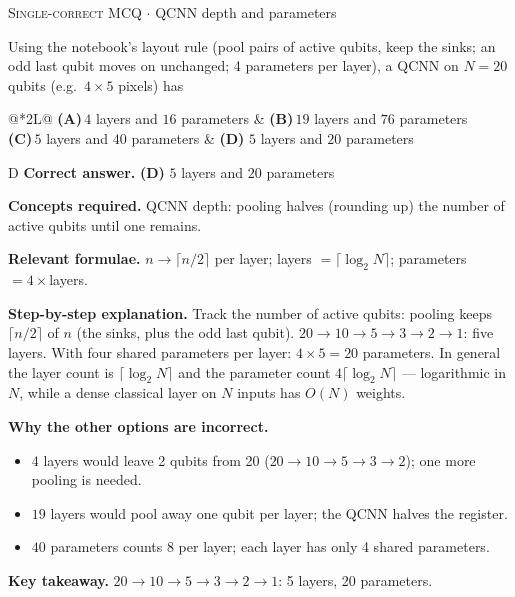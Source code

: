 \documentclass[11pt,a4paper]{article}
\newcommand{\optlabel}[1]{\textbf{(#1)}}
\newcommand{\correctlabel}[1]{\textcolor{okgreen}{\textbf{(#1)}\,\ding{51}}}
\newenvironment{qitem}[1]{\begin{list}{}{\setlength{\leftmargin}{3.3em}\setlength{\labelwidth}{3.1em}%
  \setlength{\labelsep}{0.2em}\setlength{\topsep}{3pt}\setlength{\parsep}{3pt}}\item[\textbf{Q.#1}\hfill]}{\end{list}}
\newcommand{\qsep}{\par\vspace{2pt}{\color{black!15}\hrule}\vspace{4pt}}
\newcommand{\qmeta}[2]{{\footnotesize\color{black!60}\textsc{#1} \;$\cdot$\; #2}\par}
\begin{document}
\begin{qitem}{49}
\qmeta{Single-correct MCQ}{QCNN depth and parameters}
Using the notebook's layout rule (pool pairs of active qubits, keep the sinks; an odd last qubit moves on unchanged;
4 parameters per layer), a QCNN on $N = 20$ qubits (e.g.\ $4\times5$ pixels) has
\par\smallskip\noindent\begin{tabularx}{\linewidth}{@{}*{2}{L}@{}}
\optlabel{A}\,$4$ layers and $16$ parameters & \optlabel{B}\,$19$ layers and $76$ parameters \\[3pt]
\optlabel{C}\,$5$ layers and $40$ parameters & \correctlabel{D}\,$5$ layers and $20$ parameters
\end{tabularx}
\end{qitem}
\begin{solbox}{D}
\textbf{\color{brand}Correct answer.} \textcolor{okgreen}{\textbf{(D)}} $5$ layers and $20$ parameters

\textbf{\color{brand}Concepts required.} QCNN depth: pooling halves (rounding up) the number of active qubits until one remains.

\textbf{\color{brand}Relevant formulae.} $n \to \lceil n/2\rceil$ per layer; layers $= \lceil\log_2N\rceil$; parameters $= 4\times$layers.

\textbf{\color{brand}Step-by-step explanation.} Track the number of active qubits: pooling keeps $\lceil n/2\rceil$ of $n$ (the sinks, plus the odd last qubit).
$20 \to 10 \to 5 \to 3 \to 2 \to 1$: five layers. With four shared parameters per layer: $4\times5 = 20$ parameters.
In general the layer count is $\lceil\log_2 N\rceil$ and the parameter count $4\lceil\log_2 N\rceil$ --- logarithmic in $N$, while a
dense classical layer on $N$ inputs has $O(N)$ weights.

\textbf{\color{brand}Why the other options are incorrect.}
\begin{itemize}[leftmargin=2.4em, itemsep=1pt, topsep=2pt]
\item[\textbf{(A)}] $4$ layers would leave 2 qubits from 20 ($20\to10\to5\to3\to2$); one more pooling is needed.
\item[\textbf{(B)}] $19$ layers would pool away one qubit per layer; the QCNN halves the register.
\item[\textbf{(C)}] $40$ parameters counts 8 per layer; each layer has only 4 shared parameters.
\end{itemize}
\textbf{\color{brand}Key takeaway.} $20 \to 10 \to 5 \to 3 \to 2 \to 1$: 5 layers, 20 parameters.
\end{solbox}
\qsep
\end{document}
